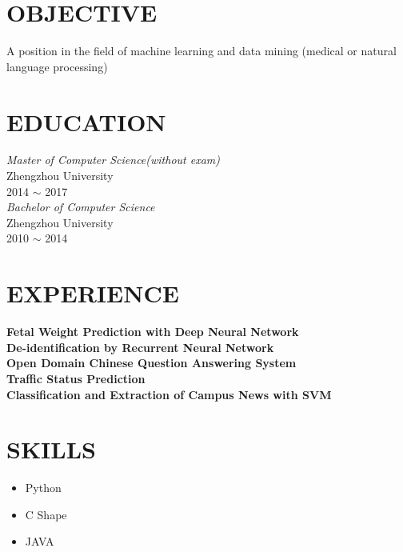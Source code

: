 \documentclass[line, margin]{res}
\begin{document}
\address{likun@stu.zzu.edu.cn}
\address{152-251-11797}

\begin{resume}
\section{OBJECTIVE}
A position in the field of machine learning and data mining (medical or natural language processing) 

\section{EDUCATION} 
 {\sl Master of Computer Science(without exam)} \\
 Zhengzhou University \\
 2014 $\sim$ 2017 \\
[15pt]
 {\sl Bachelor of Computer Science} \\
 Zhengzhou University \\
 2010 $\sim$ 2014
 
\section{EXPERIENCE}

 {\bf Fetal Weight Prediction with Deep Neural Network} \\
 {\bf De-identification by Recurrent Neural Network} \\
 {\bf Open Domain Chinese Question Answering System} \\
 {\bf Traffic Status Prediction} \\
 {\bf Classification and Extraction of Campus News with SVM} \\
 
\section{SKILLS}
\begin{itemize}
\item Python
\item C Shape
\item JAVA
\end{itemize}

\end{resume}
\end{document}
